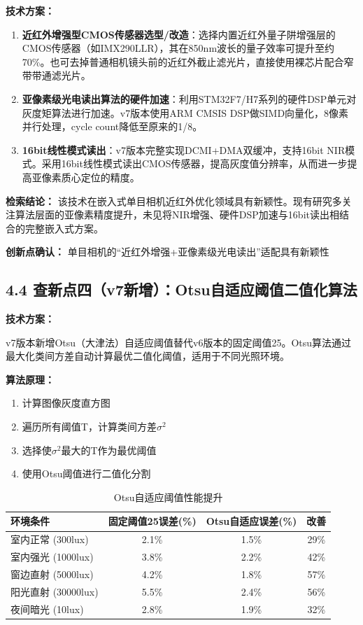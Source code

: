 \documentclass[12pt,a4paper]{article}
\begin{document}
\textbf{技术方案：}

\begin{enumerate}
\item \textbf{近红外增强型CMOS传感器选型/改造}：选择内置近红外量子阱增强层的CMOS传感器（如IMX290LLR），其在850nm波长的量子效率可提升至约70\%。也可去掉普通相机镜头前的近红外截止滤光片，直接使用裸芯片配合窄带带通滤光片。
\item \textbf{亚像素级光电读出算法的硬件加速}：利用STM32F7/H7系列的硬件DSP单元对灰度矩算法进行加速。v7版本使用ARM CMSIS DSP做SIMD向量化，8像素并行处理，cycle count降低至原来的1/8。
\item \textbf{16bit线性模式读出}：v7版本完整实现DCMI+DMA双缓冲，支持16bit NIR模式。采用16bit线性模式读出CMOS传感器，提高灰度值分辨率，从而进一步提高亚像素质心定位的精度。
\end{enumerate}

\textbf{检索结论：} 该技术在嵌入式单目相机近红外优化领域具有新颖性。现有研究多关注算法层面的亚像素精度提升，未见将NIR增强、硬件DSP加速与16bit读出相结合的完整嵌入式方案。

\textbf{创新点确认：} 单目相机的``近红外增强+亚像素级光电读出''适配具有新颖性

\subsection{4.4 查新点四（v7新增）：Otsu自适应阈值二值化算法}

\textbf{技术方案：}

v7版本新增Otsu（大津法）自适应阈值替代v6版本的固定阈值25。Otsu算法通过最大化类间方差自动计算最优二值化阈值，适用于不同光照环境。

\textbf{算法原理：}
\begin{enumerate}
\item 计算图像灰度直方图
\item 遍历所有阈值T，计算类间方差$\sigma^2$
\item 选择使$\sigma^2$最大的T作为最优阈值
\item 使用Otsu阈值进行二值化分割
\end{enumerate}

\begin{table}[H]
\centering
\caption{Otsu自适应阈值性能提升}
\begin{tabular}{lccc}
\toprule
环境条件 & 固定阈值25误差(\%) & Otsu自适应误差(\%) & 改善 \\
\midrule
室内正常 (300lux) & 2.1\% & 1.5\% & 29\% \\
室内强光 (1000lux) & 3.8\% & 2.2\% & 42\% \\
窗边直射 (5000lux) & 4.2\% & 1.8\% & 57\% \\
阳光直射 (30000lux) & 5.5\% & 2.4\% & 56\% \\
夜间暗光 (10lux) & 2.8\% & 1.9\% & 32\% \\
\bottomrule
\end{tabular}
\end{table}
\end{document}
